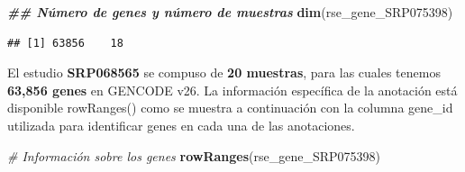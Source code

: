 \documentclass[
]{article}
\newenvironment{Shaded}{\begin{snugshade}}{\end{snugshade}}
\newcommand{\CommentTok}[1]{\textcolor[rgb]{0.56,0.35,0.01}{\textit{#1}}}
\newcommand{\DocumentationTok}[1]{\textcolor[rgb]{0.56,0.35,0.01}{\textbf{\textit{#1}}}}
\newcommand{\FunctionTok}[1]{\textcolor[rgb]{0.13,0.29,0.53}{\textbf{#1}}}
\newcommand{\NormalTok}[1]{#1}
\begin{document}
\begin{Shaded}
\begin{Highlighting}[]
\DocumentationTok{\#\# Número de genes y número de muestras}
\FunctionTok{dim}\NormalTok{(rse\_gene\_SRP075398)}
\end{Highlighting}
\end{Shaded}

\begin{verbatim}
## [1] 63856    18
\end{verbatim}

El estudio \textbf{SRP068565} se compuso de \textbf{20 muestras}, para
las cuales tenemos \textbf{63,856 genes} en GENCODE v26. La información
específica de la anotación está disponible rowRanges() como se muestra a
continuación con la columna gene\_id utilizada para identificar genes en
cada una de las anotaciones.

\begin{Shaded}
\begin{Highlighting}[]
\CommentTok{\# Información sobre los genes}
\FunctionTok{rowRanges}\NormalTok{(rse\_gene\_SRP075398)}
\end{Highlighting}
\end{Shaded}
\end{document}
